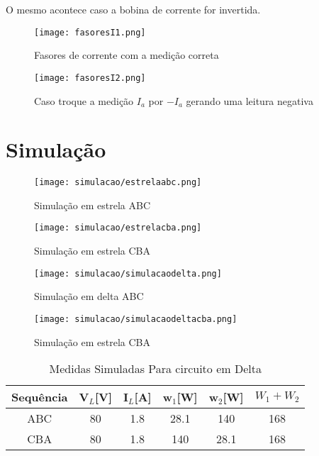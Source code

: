 \documentclass[a4paper, 12pt]{article}
\begin{document}
	O mesmo acontece caso a bobina de corrente for invertida.
	\begin{figure}[H]
		\centering %
		\texttt{[image: fasoresI1.png]}
		\caption{Fasores de corrente com a medição correta}
	\end{figure}
	\begin{figure}[H]
		\centering %
		\texttt{[image: fasoresI2.png]}
		\caption{Caso troque a medição $I_{a}$ por $-I_a$ gerando uma leitura negativa}
	\end{figure}
	
	\newpage
	\section{Simulação}
	\justifying
	\begin{figure}[H]
		\centering %
		\texttt{[image: simulacao/estrelaabc.png]}
		\caption{Simulação em estrela ABC}
	\end{figure}
	\begin{figure}[H]
		\centering %
		\texttt{[image: simulacao/estrelacba.png]}
		\caption{Simulação em estrela CBA}
	\end{figure}
	\begin{figure}[H]
		\centering %
		\texttt{[image: simulacao/simulacaodelta.png]}
		\caption{Simulação em delta ABC}
	\end{figure}
	\begin{figure}[H]
		\centering %
		\texttt{[image: simulacao/simulacaodeltacba.png]}
		\caption{Simulação em estrela CBA}
	\end{figure}
	\begin{table}[H]
		\centering
		\begin{tabular}{|c|c|c|c|c|c|}
			\hline %
			Sequência & V$_L$[V] & I$_L$[A] & w$_1$[W] & w$_2$[W] & $W_1 + W_2$ \\
			\hline %
			ABC & 80 & 1.8 & 28.1 & 140 & 168     \\
			\hline %
			CBA & 80 & 1.8 & 140 & 28.1 & 168     \\
			\hline %
		\end{tabular}
		\caption{Medidas Simuladas  Para circuito em Delta}
	\end{table}
	
\end{document}
